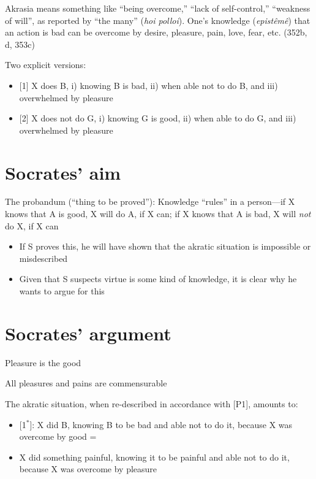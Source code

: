 \documentclass[oneside]{article}
\begin{document}
\begin{itemize}
Akrasia means something like ``being overcome,'' ``lack of self-control,'' ``weakness of will'', as reported by ``the many'' (\emph{hoi polloi}). One's knowledge (\emph{epist\^{e}m\^{e}}) that an action is bad can be overcome by desire, pleasure, pain, love, fear, etc. (352b, d, 353c)
\vspace*{2mm}

\noindent Two explicit versions:

\begin{itemize}\item{[1] X does B, i) knowing B is bad, ii) when able not to do B, and iii) overwhelmed by pleasure}
\item{[2] X does not do G, i) knowing G is good, ii) when able to do G, and iii) overwhelmed by pleasure}\end{itemize}

\section*{Socrates' aim}

\noindent The probandum (``thing to be proved''): Knowledge ``rules'' in a person---if X knows that A is good, X will do A, if X can; if X knows that A is bad, X will \emph{not} do X, if X can

\begin{itemize}\item{If S proves this, he will have shown that the akratic situation is impossible or misdescribed}

\item{Given that S suspects virtue is some kind of knowledge, it is clear why he wants to argue for this}\end{itemize}

\section*{Socrates' argument}

\noindent [P1] Pleasure is the good
\vspace*{2mm}

\noindent [P2] All pleasures and pains are commensurable
\vspace*{2mm}

\noindent [P3] The akratic situation, when re-described in accordance with [P1], amounts to:

\begin{itemize}
\item{[1$^{*}$]: X did B, knowing B to be bad and able not to do it, because X was overcome by good =}
\item{X did something painful, knowing it to be painful and able not to do it, because X was overcome by pleasure}\end{itemize}
\vspace*{2mm}
 

\end{itemize}
\end{document}
